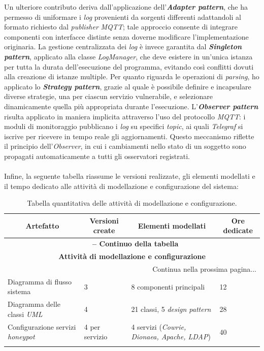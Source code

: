 Un ulteriore contributo deriva dall'applicazione dell'\textbf{\textit{Adapter pattern}}, che ha permesso di uniformare i \textit{log} provenienti da sorgenti differenti adattandoli al formato richiesto dal \textit{publisher} \textit{MQTT}; tale approccio consente di integrare componenti con interfacce distinte senza doverne modificare l'implementazione originaria. 
La gestione centralizzata dei \textit{log} è invece garantita dal \textbf{\textit{Singleton pattern}}, applicato alla classe \textit{LogManager}, che deve esistere in un'unica istanza per tutta la durata dell'esecuzione del programma, evitando così conflitti dovuti alla creazione di istanze multiple. 
Per quanto riguarda le operazioni di \textit{parsing}, ho applicato lo \textbf{\textit{Strategy pattern}}, grazie al quale è possibile definire e incapsulare diverse strategie, una per ciascun servizio vulnerabile, e selezionare dinamicamente quella più appropriata durante l'esecuzione. 
L'\textbf{\textit{Observer pattern}} risulta applicato in maniera implicita attraverso l'uso del protocollo \textit{MQTT}: i moduli di monitoraggio pubblicano i \textit{log} su specifici \textit{topic}, ai quali \textit{Telegraf} si iscrive per ricevere in tempo reale gli aggiornamenti. 
Questo meccanismo riflette il principio dell'\textit{Observer}, in cui i cambiamenti nello stato di un soggetto sono propagati automaticamente a tutti gli osservatori registrati.\\\\
Infine, la seguente tabella riassume le versioni realizzate, gli elementi modellati e il tempo dedicato alle attività di modellazione e configurazione del sistema:
\begin{center}
\begin{longtable}{|p{}|p{}|p{}|p{}|}
\hline
\multicolumn{1}{|c|}{\textbf{Artefatto}} & 
\multicolumn{1}{c|}{\textbf{Versioni create}} & 
\multicolumn{1}{c|}{\textbf{Elementi modellati}} & 
\multicolumn{1}{c|}{\textbf{Ore dedicate}} \\ 
\hline
\endfirsthead

\multicolumn{4}{c}{{\bfseries \tablename\ \thetable{} -- Continuo della tabella}}\\
\hline
\multicolumn{4}{|c|}{\textbf{Attività di modellazione e configurazione}} \\ \hline
\endhead

\hline \multicolumn{4}{|r|}{{Continua nella prossima pagina...}} \\ \hline
\endfoot

\endlastfoot

Diagramma di flusso sistema & 3 & 8 componenti principali & 12 \\ \hline
Diagramma delle classi \textit{UML} & 4 & 21 classi, 5 \textit{design pattern} & 28 \\ \hline
Configurazione servizi \textit{honeypot} & 4 per servizio & 4 servizi (\textit{Cowrie, Dionaea, Apache, LDAP}) & 40 \\ \hline

\caption{Tabella quantitativa delle attività di modellazione e configurazione.}
\label{tab:modellazione-configurazione}
\end{longtable}
\end{center}